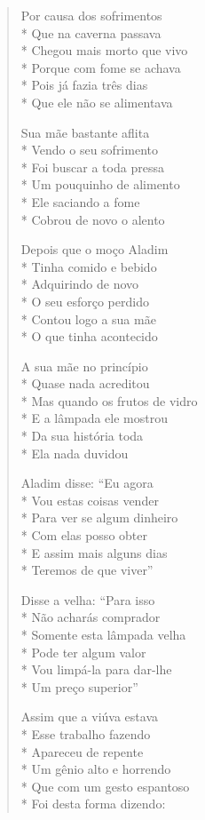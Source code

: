 \begin{verse}
Por causa dos sofrimentos\\*
Que na caverna passava\\*
Chegou mais morto que vivo\\*
Porque com fome se achava\\*
Pois já fazia três dias\\*
Que ele não se alimentava

Sua mãe bastante aflita\\*
Vendo o seu sofrimento\\*
Foi buscar a toda pressa\\*
Um pouquinho de alimento\\*
Ele saciando a fome\\*
Cobrou de novo o alento

Depois que o moço Aladim\\*
Tinha comido e bebido\\*
Adquirindo de novo\\*
O seu esforço perdido\\*
Contou logo a sua mãe\\*
O que tinha acontecido

A sua mãe no princípio\\*
Quase nada acreditou\\*
Mas quando os frutos de vidro\\*
E a lâmpada ele mostrou\\*
Da sua história toda\\*
Ela nada duvidou

Aladim disse: ``Eu agora\\*
Vou estas coisas vender\\*
Para ver se algum dinheiro\\*
Com elas posso obter\\*
E assim mais alguns dias\\*
Teremos de que viver''

Disse a velha: ``Para isso\\*
Não acharás comprador\\*
Somente esta lâmpada velha\\*
Pode ter algum valor\\*
Vou limpá-la para dar-lhe\\*
Um preço superior''

Assim que a viúva estava\\*
Esse trabalho fazendo\\*
Apareceu de repente\\*
Um gênio alto e horrendo\\*
Que com um gesto espantoso\\*
Foi desta forma dizendo:


\end{verse}
